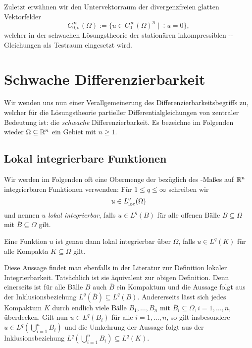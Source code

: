 Zuletzt erwähnen wir den Untervektorraum der divergenzfreien glatten Vektorfelder
$$
C_{0,\sigma}^\infty(\Omega) := \{u \in C_0^\infty(\Omega)^n \mid \div u = 0\},
$$
 welcher in der schwachen Lösungstheorie der stationären inkompressiblen \navier\hyp{}\stokes\hyp{}Gleichungen als Testraum eingesetzt wird.

\section{Schwache Differenzierbarkeit}
\label{subsec:distributionsSobolev}

Wir wenden uns nun einer Verallgemeinerung des Differenzierbarkeitsbegriffs zu, welcher für die Lösungstheorie partieller Differentialgleichungen von zentraler Bedeutung ist: die \emph{schwache} Differenzierbarkeit.
Es bezeichne im Folgenden wieder $\Omega \subseteq \mathbb{R}^n$ ein Gebiet mit $n \geq 1$.

\subsection{Lokal integrierbare Funktionen}

Wir werden im Folgenden oft eine Obermenge der bezüglich des \lebesgue\hyp{}Maßes auf $\mathbb{R}^n$ integrierbaren Funktionen verwenden:
Für $1 \leq q \leq \infty$ schreiben wir
$$
  u \in L^q_{\operatorname{loc}}(\Omega)
$$
und nennen $u$ \emph{lokal integrierbar}, falls $u \in L^q(B)$ für alle offenen Bälle $B \subseteq \Omega$ mit $\overline B \subseteq \Omega$ gilt.

\begin{bem}
  Eine Funktion $u$ ist genau dann lokal integrierbar über $\Omega$, falls $u \in L^q(K)$ für alle Kompakta $K \subseteq \Omega$ gilt.

  Diese Aussage findet man ebenfalls in der Literatur zur Definition lokaler Integrierbarkeit.
  Tatsächlich ist sie äquivalent zur obigen Definition.
  Denn einerseits ist für alle Bälle $B$ auch $\overline B$ ein Kompaktum und die Aussage folgt aus der Inklusionsbeziehung $L^q(\overline B) \subseteq L^q(B)$.
  Andererseits lässt sich jedes Kompaktum $K$ durch endlich viele Bälle $B_1, \dots, B_n$ mit $\overline B_i \subseteq \Omega, i =1,\dots,n,$ überdecken. 
  Gilt nun $u \in L^q(B_i)$ für alle $i = 1, \dots, n$, so gilt insbesondere $u \in L^q(\bigcup_{i = 1}^n B_i)$ und die Umkehrung der Aussage folgt aus der Inklusionsbeziehung $L^q(\bigcup_{i = 1}^n B_i) \subseteq L^q(K)$.
\end{bem}

